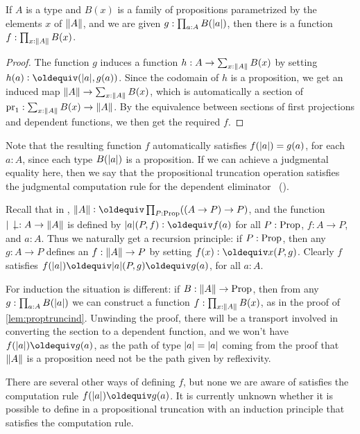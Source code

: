 \documentclass[a4paper,12pt]{amsart}
\begin{document}
\begin{lemma}\label{lem:proptruncind}
  If $A$ is a type and $B(x)$ is a family of propositions
  parametrized by the elements $x$ of $\lVert A\rVert$,
  and we are given $g : \prod_{a:A} B(\lvert a\rvert)$,
  then there is a function $f : \prod_{x:\lVert A\rVert} B(x)$.
\end{lemma}
\begin{proof}
  The function $g$ induces a function $h : A \to \sum_{x:\lVert A\rVert}B(x)$
  by setting $h(a) \defeq (\trunc a,g(a))$.
  Since the codomain of $h$ is a proposition,
  we get an induced map $\lVert A\rVert \to \sum_{x:\lVert A\rVert}B(x)$,
  which is automatically a section of $\operatorname{pr}_1 : \sum_{x:\lVert A\rVert}B(x) \to \lVert A\rVert$.
  By the equivalence between sections of first projections
  and dependent functions, we then get the required $f$.
\end{proof}
Note that the resulting function $f$ automatically satisfies
$f(\lvert a\rvert) = g(a)$, for each $a:A$,
since each type $B(\lvert a\rvert)$ is a proposition.
If we can achieve a judgmental equality here,
then we say that the propositional truncation operation satisfies the
judgmental computation rule for the dependent eliminator~%
().

Recall that in \UniMath{}, $\Trunc A \defeq \prod_{P:\Prop}((A \to P) \to P)$, and
the function $\trunc{\blank}: A\to\Trunc A$ is
defined by $\trunc a  (P,f) \defeq f(a)$ for all $P: \mathord{\mathrm{Prop}}$, $f: A\to P$, and $a:A$.
Thus we naturally get a recursion principle: if $P: \mathord{\mathrm{Prop}}$, then any
$g: A \to P$ defines an $f : \lVert A\rVert \to P$ by setting $f(x)\defeq x(P,g)$.
Clearly $f$ satisfies $f(\trunc a) \jdeq \trunc a (P,g) \jdeq g(a)$, for all $a:A$.

For induction the situation is different: if $B: \lVert A\rVert \to \mathord{\mathrm{Prop}}$,
then from any $g: \prod_{a:A} B(\lvert a\rvert)$ we can construct a function
$f: \prod_{x:\lVert A\rVert} B(x)$, as in the proof of \cref{lem:proptruncind}.
Unwinding the proof, there will be a transport involved in converting
the section to a dependent function, and we won't have $f(\trunc a) \jdeq g(a)$,
as the path of type $\lvert a\rvert = \lvert a\rvert$ coming from the proof that $\lVert A\rVert$ is
a proposition need not be the path given by reflexivity.

There are several other ways of defining $f$, but none we are aware of
satisfies the computation rule $f(\trunc a)\jdeq g(a)$.  It is currently
unknown whether it is possible to define in \UniMath{} a propositional
truncation with an induction principle that satisfies the computation rule.
\end{document}

